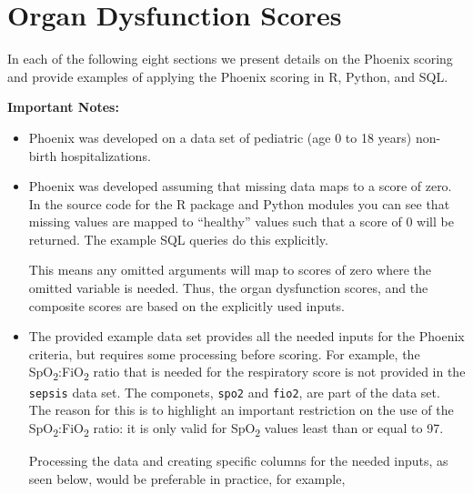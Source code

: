 \documentclass[
  letterpaper,
  DIV=11,
  numbers=noendperiod]{scrartcl}
\begin{document}
\section{Organ Dysfunction Scores}\label{organ-dysfunction-scores}

In each of the following eight sections we present details on the
Phoenix scoring and provide examples of applying the Phoenix scoring in
R, Python, and SQL.

\textbf{Important Notes:}

\begin{itemize}
\item
  Phoenix was developed on a data set of pediatric (age 0 to 18 years)
  non-birth hospitalizations.
\item
  Phoenix was developed assuming that missing data maps to a score of
  zero. In the source code for the R package and Python modules you can
  see that missing values are mapped to ``healthy'' values such that a
  score of 0 will be returned. The example SQL queries do this
  explicitly.

  This means any omitted arguments will map to scores of zero where the
  omitted variable is needed. Thus, the organ dysfunction scores, and
  the composite scores are based on the explicitly used inputs.
\item
  The provided example data set provides all the needed inputs for the
  Phoenix criteria, but requires some processing before scoring. For
  example, the SpO\textsubscript{2}:FiO\textsubscript{2} ratio that is
  needed for the respiratory score is not provided in the
  \texttt{sepsis} data set. The componets, \texttt{spo2} and
  \texttt{fio2}, are part of the data set. The reason for this is to
  highlight an important restriction on the use of the
  SpO\textsubscript{2}:FiO\textsubscript{2} ratio: it is only valid for
  SpO\textsubscript{2} values least than or equal to 97.

  Processing the data and creating specific columns for the needed
  inputs, as seen below, would be preferable in practice, for example,
\end{itemize}
\end{document}
